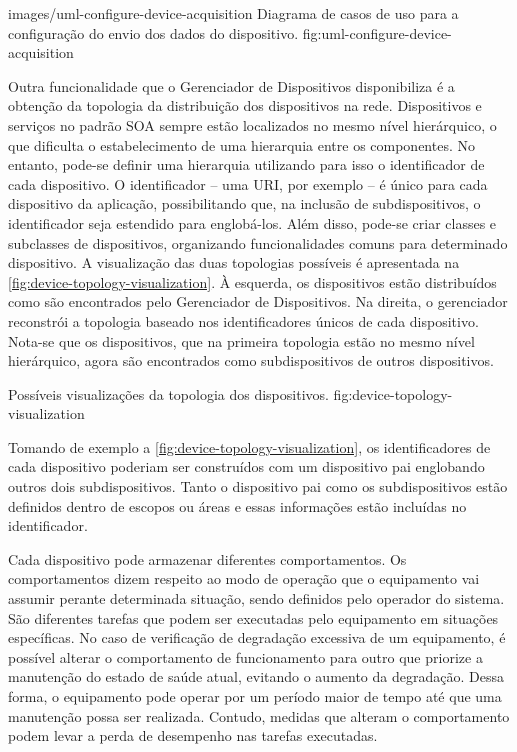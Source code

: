   {images/uml-configure-device-acquisition}
  {Diagrama de casos de uso para a configuração do envio dos dados do dispositivo.}
  {fig:uml-configure-device-acquisition}

Outra funcionalidade que o Gerenciador de Dispositivos disponibiliza é a obtenção da topologia da
distribuição dos dispositivos na rede. Dispositivos e serviços no padrão \gls{SOA} sempre estão
localizados no mesmo nível hierárquico, o que dificulta o estabelecimento de uma hierarquia entre os
componentes. No entanto, pode-se definir uma hierarquia utilizando para isso o identificador de cada
dispositivo. O identificador -- uma \gls{URI}, por exemplo -- é único para cada dispositivo da
aplicação, possibilitando que, na inclusão de subdispositivos, o identificador seja estendido para
englobá-los. Além disso, pode-se criar classes e subclasses de dispositivos, organizando
funcionalidades comuns para determinado dispositivo. A visualização das duas topologias possíveis é
apresentada na \cref{fig:device-topology-visualization}. À esquerda, os dispositivos estão
distribuídos como são encontrados pelo Gerenciador de Dispositivos. Na direita, o gerenciador
reconstrói a topologia baseado nos identificadores únicos de cada dispositivo. Nota-se que os
dispositivos, que na primeira topologia estão no mesmo nível hierárquico, agora são encontrados como
subdispositivos de outros dispositivos.

  {Possíveis visualizações da topologia dos dispositivos.}
  {fig:device-topology-visualization}

Tomando de exemplo a \cref{fig:device-topology-visualization}, os identificadores de cada
dispositivo poderiam ser construídos com um dispositivo pai englobando outros dois subdispositivos.
Tanto o dispositivo pai como os subdispositivos estão definidos dentro de escopos ou áreas e essas
informações estão incluídas no identificador.


Cada dispositivo pode armazenar diferentes comportamentos. Os comportamentos dizem respeito ao modo
de operação que o equipamento vai assumir perante determinada situação, sendo definidos pelo
operador do sistema. São diferentes tarefas que podem ser executadas pelo equipamento em situações
específicas. No caso de verificação de degradação excessiva de um equipamento, é possível alterar o
comportamento de funcionamento para outro que priorize a manutenção do estado de saúde atual,
evitando o aumento da degradação. Dessa forma, o equipamento pode operar por um período maior de
tempo até que uma manutenção possa ser realizada. Contudo, medidas que alteram o comportamento podem
levar a perda de desempenho nas tarefas executadas.

